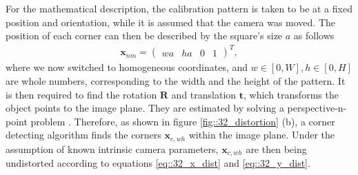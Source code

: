 For the mathematical description, the calibration pattern is taken to be at a fixed position and orientation, while it is assumed that the camera was moved. The position of each corner can then be described by the square's size $a$ as follows
\begin{align}
	\bm{x}_{nm} = \begin{pmatrix}
	wa & ha & 0 & 1
	\end{pmatrix}^T,
	\label{eq::32_square_size}
\end{align}
where we now switched to homogeneous coordinates, and $w\in[0,W],h\in[0,H]$ are whole numbers, corresponding to the width and the height of the pattern. It is then required to find the rotation $\bm{R}$ and translation $\bm{t}$, which transforms the object points to the image plane. They are estimated by solving a perspective-n-point problem \cite{fischler1981random}. Therefore, as shown in figure \ref{fig::32_distortion} (b), a corner detecting algorithm finds the corners $\bm{x}_{c,wh}$ within the image plane. Under the assumption of known intrinsic camera parameters, $\bm{x}_{c,wh}$ are then being undistorted according to equations \ref{eq::32_x_dist} and \ref{eq::32_y_dist}. 
